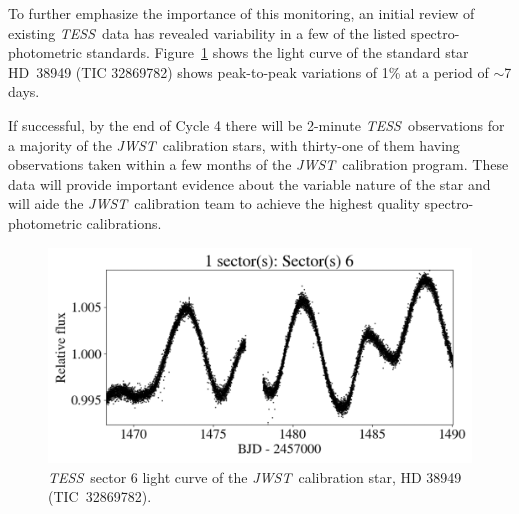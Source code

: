 \documentclass[letterpaper,12pt]{article}
\newcommand{\tess}{{\it TESS}}
\newcommand{\jwst}{{\it JWST}}
\begin{document}
To further emphasize the importance of this monitoring, an initial review of existing \tess\ data has revealed variability in a few of the listed spectro-photometric standards.  Figure~\ref{fig:lc} shows the light curve of the standard star HD~38949 (TIC 32869782) shows peak-to-peak variations of 1\% at a period of $\sim$7 days. 

If successful, by the end of Cycle 4 there will be 2-minute \tess\ observations for a majority of the \jwst\ calibration stars, with thirty-one of them having observations taken within a few months of the \jwst\ calibration program. These data will provide important evidence about the variable nature of the star and will aide the \jwst\ calibration team to achieve the highest quality spectro-photometric calibrations.


\begin{figure}
    \centering
    \includegraphics[scale=.5]{HR38949_lc.png}
    \caption{\tess\ sector 6 light curve of the \jwst\ calibration star, HD 38949 (TIC~32869782).}
    \label{fig:lc}
\end{figure}



\end{document}
